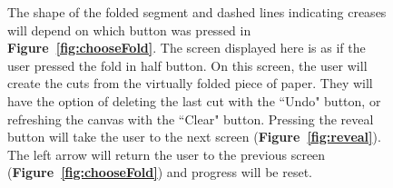 \documentclass[11pt]{article}
\begin{document}
\begin{figure}
                \begin{minipage}[c]{0.65\textwidth}
                \caption{The shape of the folded segment and dashed lines indicating creases will depend on which button was pressed in \textbf{Figure~\ref{fig:chooseFold}}. The screen displayed here is as if the user pressed the fold in half button. On this screen, the user will create the cuts from the virtually folded piece of paper. They will have the option of deleting the last cut with the ``Undo" button, or refreshing the canvas with the ``Clear" button. Pressing the reveal button will take the user to the next screen (\textbf{Figure~\ref{fig:reveal}}). The left arrow will return the user to the previous screen (\textbf{Figure~\ref{fig:chooseFold}}) and progress will be reset.}
                \label{fig:createPattern}
                \end{minipage}
            \end{figure}
            
\end{document}
